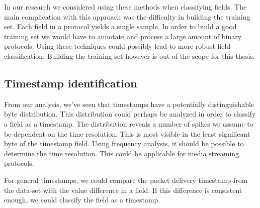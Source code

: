 \documentclass[a4paper]{report}
\begin{document}
In our research we considered using these methods when classifying fields.
The main complication with this approach was the difficulty in building the
training set. Each field in a protocol yields a single sample. In order to
build a good training set we would have to annotate and process a large
amount of binary protocols. Using these techniques could possibly lead to
more robust field classification. Building the training set however is out
of the scope for this thesis.

\subsection{Timestamp identification}
From our analysis, we've seen that timestamps have a potentially
distinguishable byte distribution. This distribution could perhaps be analyzed
in order to classify a field as a timestamp. The distribution reveals a number
of spikes we assume to be dependent on the time resolution. This is most
visible in the least significant byte of the timestamp field. Using frequency
analysis, it should be possible to determine the time resolution. This could
be applicable for media streaming protocols.

For general timestamps, we could compare the packet delivery timestamp from
the data-set with the value difference in a field. If this difference is
consistent enough, we could classify the field as a timestamp.



\end{document}

